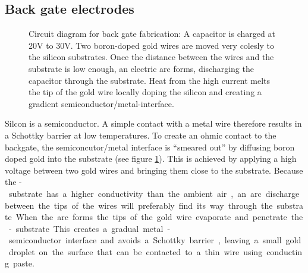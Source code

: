\subsection{Back gate electrodes}

\begin{figure}
	\centering
	\caption{Circuit diagram for back gate fabrication: A capacitor is charged at 20V to 30V. Two boron-doped gold wires are moved very colesly to the silicon substrates. Once the distance between the wires and the substrate is low enough, an electric arc forms, discharging the capacitor through the substrate. Heat from the high current melts the tip of the gold wire locally doping the silicon and creating a gradient semiconductor/metal-interface.}\label{arc}
\end{figure}

Silcon is a semiconductor. A simple contact with a metal wire therefore results in a Schottky barrier at low temperatures. To create an ohmic contact to the backgate, the semiconcutor/metal interface is ``smeared out'' by diffusing boron doped gold into the substrate (see figure \ref{arc}). This is achieved by applying a high voltage between two gold wires and bringing them close to the substrate. Because the \si-substrate has a higher conductivity than the ambient air, an arc discharge between the tips of the wires will preferably find its way through the substrate. When the arc forms the tips of the gold wire evaporate and penetrate the \si-substrate. This creates a gradual metal-semiconductor interface and avoids a Schottky barrier, leaving a small gold droplet on the surface that can be contacted to a thin wire using conducting paste.

